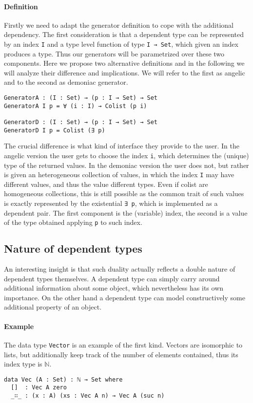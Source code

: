 \documentclass[10pt,a4paper]{article}
\begin{document}
\paragraph{Definition}
Firstly we need to adapt the generator definition to cope with the additional dependency. The first consideration is that a dependent type can be represented by an index \texttt{I} and a type level function of type \texttt{I → Set}, which given an index produces a type. Thus our generators will be parametrized over these two components.
Here we propose two alternative definitions and in the following we will analyze their difference and implications. We will refer to the first as angelic and to the second as demoniac generator.
\begin{verbatim}
GeneratorA : (I : Set) → (p : I → Set) → Set
GeneratorA I p = ∀ (i : I) → Colist (p i)

GeneratorD : (I : Set) → (p : I → Set) → Set
GeneratorD I p = Colist (∃ p)
\end{verbatim}
The crucial difference is what kind of interface they provide to the user.
In the angelic version the user gets to choose the index \texttt{i}, which determines the (unique) type of the returned values. In the demoniac version the user does not, but rather is given an heterogeneous collection of values, in which the index \texttt{I} may have different values, and thus the value different types. Even if colist are homogeneous collections, this is still possible as the common trait of such values is exactly represented by the existential \texttt{∃ p}, which is implemented as a dependent pair. The first component is the (variable) index, the second is a value of the type obtained applying \texttt{p} to such index.

\subsection{Nature of dependent types}
An interesting insight is that such duality actually reflects a double nature of dependent types themselves. 
A dependent type can simply carry around additional information about some object, which nevertheless has its own importance.
On the other hand a dependent type can model constructively some additional property of an object.

\paragraph{Example}
The data type \texttt{Vector} is an example of the first kind.
Vectors are isomorphic to lists, but additionally keep track of the number of elements contained, thus its index type is $\mathbb{N}$.
\begin{verbatim}
data Vec (A : Set) : ℕ → Set where
  []  : Vec A zero
  _∷_ : (x : A) (xs : Vec A n) → Vec A (suc n)
\end{verbatim}
\end{document}
